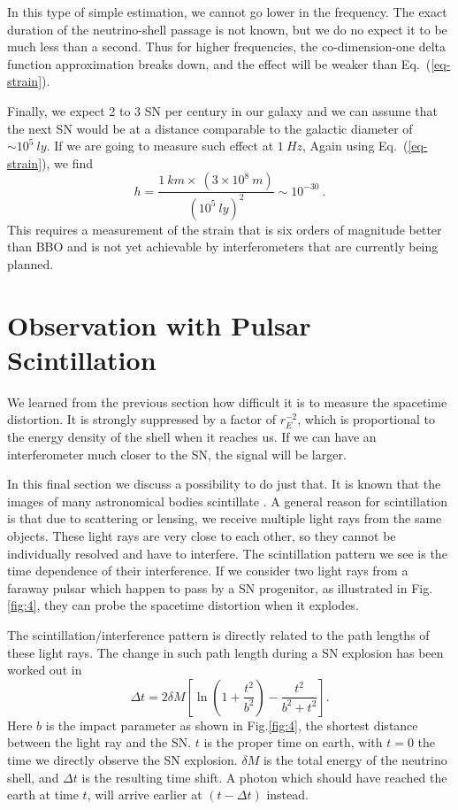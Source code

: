\documentclass[aps,showpacs,twocolumn,floats,prd,superscriptaddress,nofootinbib]{revtex4-1}
\begin{document}
In this type of simple estimation, we cannot go lower in the frequency. The exact duration of the neutrino-shell passage is not known, but we do no expect it to be much less than a second. Thus for higher frequencies, the co-dimension-one delta function approximation breaks down, and the effect will be weaker than Eq.~(\ref{eq-strain}).

Finally, we expect 2 to 3 SN per century in our galaxy and we can assume that the next SN would be at a distance comparable to the galactic diameter of $\sim 10^5 \ ly$. If we are going to measure such effect at $1 \ Hz$, Again using Eq.~(\ref{eq-strain}), we find
\begin{equation}
	h = \frac{ 1~km \times ~ (3\times10^8~m)}{(10^5~ly)^2}\sim 10^{-30}~.
\end{equation}
This requires a measurement of the strain that is six orders of magnitude better than BBO and is not yet achievable by interferometers that are currently being planned. 

\section{Observation with Pulsar Scintillation}
\label{sec-scint}

\twocolumngrid

We learned from the previous section how difficult it is to measure the spacetime distortion. It is strongly suppressed by a factor of $r_E^{-2}$, which is proportional to the energy density of the shell when it reaches us. If we can have an interferometer much closer to the SN, the signal will be larger.

In this final section we discuss a possibility to do just that. It is known that the images of many astronomical bodies scintillate \cite{PulsarScint}. A general reason for scintillation is that due to scattering or lensing, we receive multiple light rays from the same objects. These light rays are very close to each other, so they cannot be individually resolved and have to interfere. The scintillation pattern we see is the time dependence of their interference. If we consider two light rays from a faraway pulsar which happen to pass by a SN progenitor, as illustrated in Fig.\ref{fig:4}, they can probe the spacetime distortion when it explodes. 

The scintillation/interference pattern is directly related to the path lengths of these light rays. The change in such path length during a SN explosion has been worked out in \cite{Olum:2013gza}
\begin{equation}
	\Delta t = 2\delta M \left[ \ln \left(1 + \frac{t^2}{b^2} \right) - \frac{t^2}{b^2 + t^2} \right].
\end{equation}
Here $b$ is the impact parameter as shown in Fig.\ref{fig:4}, the shortest distance between the light ray and the SN. $t$ is the proper time on earth, with $t=0$ the time we directly observe the SN explosion. $\delta M$ is the total energy of the neutrino shell, and $\Delta t$ is the resulting time shift. A photon which should have reached the earth at time $t$, will arrive earlier at $(t-\Delta t)$ instead.
\end{document}
